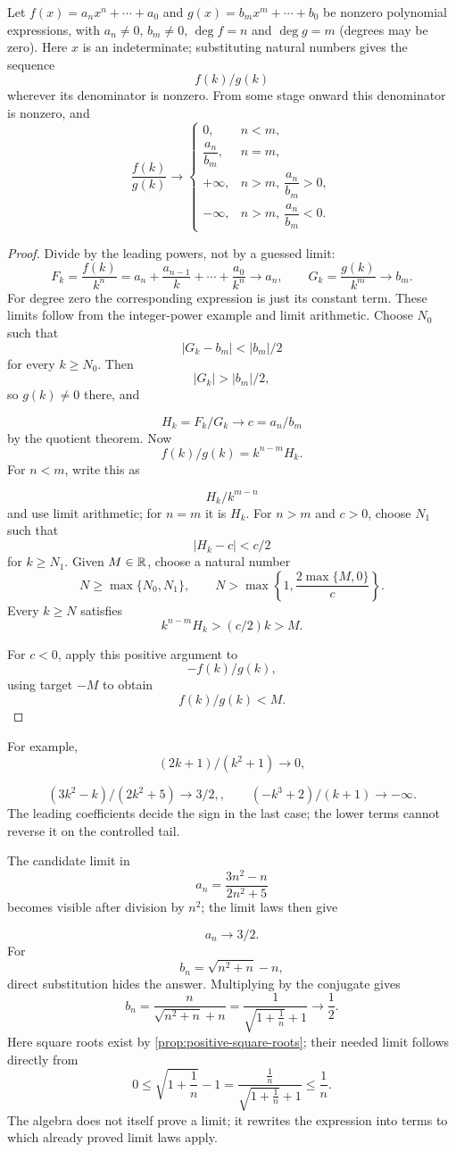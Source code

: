 \begin{proposition}
\label{prop:polynomial-sequence}
Let $f(x)=a_nx^n+\cdots+a_0$ and $g(x)=b_mx^m+\cdots+b_0$
be nonzero polynomial expressions, with $a_n\ne0$, $b_m\ne0$,
$\deg f=n$ and $\deg g=m$ (degrees may be zero).
Here $x$ is an indeterminate; substituting natural numbers gives the
sequence
\[
f(k)/g(k)
\]
 wherever its denominator is nonzero.
From some stage onward this denominator is nonzero, and
\[
\frac{f(k)}{g(k)}\longrightarrow
\begin{cases}
0,&n<m,\\
\dfrac{a_n}{b_m},&n=m,\\
+\infty,&n>m,\ \dfrac{a_n}{b_m}>0,\\
-\infty,&n>m,\ \dfrac{a_n}{b_m}<0.
\end{cases}
\]
\end{proposition}
\begin{proof}
Divide by the leading powers, not by a guessed limit:
\[
F_k=\frac{f(k)}{k^n}=a_n+\frac{a_{n-1}}k+\cdots+\frac{a_0}{k^n}\to a_n,
\qquad G_k=\frac{g(k)}{k^m}\to b_m.
\]
For degree zero the corresponding expression is just its constant term.
These limits follow from the integer-power example and limit arithmetic.
Choose $N_0$ such that
\[
|G_k-b_m|<|b_m|/2
\]
 for every $k\geq N_0$.
Then
\[
|G_k|>|b_m|/2,
\]
 so $g(k)\ne0$ there, and

\[
H_k=F_k/G_k\to c=a_n/b_m
\]
 by the quotient theorem.
Now
\[
f(k)/g(k)=k^{n-m}H_k.
\]
 For $n<m$, write this as

\[
H_k/k^{m-n}
\]
 and use limit arithmetic; for $n=m$ it is $H_k$.
For $n>m$ and $c>0$, choose $N_1$ such that
\[
|H_k-c|<c/2
\]
 for
$k\geq N_1$. Given $M\in\mathbb{R}$, choose a natural number
\[
N\geq\max\{N_0,N_1\},
\qquad
N>\max\left\{1,\frac{2\max\{M,0\}}c\right\}.
\]
Every $k\geq N$ satisfies
\[
k^{n-m}H_k>(c/2)k>M.
\]

For $c<0$, apply this positive argument to
\[
-f(k)/g(k),
\]
 using
target $-M$ to obtain
\[
f(k)/g(k)<M.
\]

\end{proof}
For example,
\[
(2k+1)/(k^2+1)\to0,
\]


\[
(3k^2-k)/(2k^2+5)\to3/2,,\qquad (-k^3+2)/(k+1)\to-\infty.
\]
 The leading coefficients decide the
sign in the last case; the lower terms cannot reverse it on the controlled tail.

\begin{example}
The candidate limit in
\[
a_n=\frac{3n^2-n}{2n^2+5}
\]
becomes visible after division by $n^2$; the limit laws then give

\[
a_n\to3/2.
\]
  For
\[
b_n=\sqrt{n^2+n}-n,
\]
direct substitution hides the answer.  Multiplying by the conjugate gives
\[
b_n=\frac{n}{\sqrt{n^2+n}+n}
=\frac{1}{\sqrt{1+\frac1n}+1}\longrightarrow\frac12.
\]
Here square roots exist by \cref{prop:positive-square-roots}; their needed
limit follows directly from
\[
0\leq\sqrt{1+\frac1n}-1
=\frac{\frac1n}{\sqrt{1+\frac1n}+1}
\leq\frac1n.
\]
The algebra does not itself prove a limit; it rewrites the expression into
terms to which already proved limit laws apply.
\end{example}

